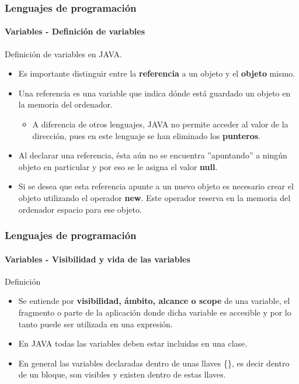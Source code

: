 \documentclass{beamer}
\begin{document}
\begin{frame}
  \frametitle{Lenguajes de programación} 
  \framesubtitle{Variables - Definición de variables}

  Definición de variables en JAVA.

  \begin{itemize}
  \item Es importante distinguir entre la \textbf{referencia} a un objeto y el \textbf{objeto} mismo.
  \item Una referencia es una variable que indica dónde está guardado un objeto en la memoria del ordenador.
    \begin{itemize}
    \item A diferencia de otros lenguajes, JAVA no permite acceder al valor de la dirección, pues en este lenguaje se han eliminado los \textbf{punteros}.
    \end{itemize}
  \item Al declarar una referencia, ésta aún no se encuentra ''apuntando'' a ningún objeto en particular y por eso se le asigna el valor \textbf{null}.
  \item Si se desea que esta referencia apunte a un nuevo objeto es necesario crear el objeto utilizando el operador \textbf{new}. Este operador reserva en la memoria del ordenador espacio para ese objeto. 
  \end{itemize}
\end{frame}

\begin{frame}
  \frametitle{Lenguajes de programación} 
  \framesubtitle{Variables - Visibilidad y vida de las variables}

  \begin{block}{Definición}
    \begin{itemize}
    \item Se entiende por \textbf{visibilidad, ámbito, alcance o scope} de una variable, el fragmento o parte de la aplicación donde dicha variable es accesible y por lo tanto puede ser utilizada en una expresión.
    \item En JAVA todas las variables deben estar incluidas en una clase.
    \item En general las variables declaradas dentro de unas llaves \{\}, es decir dentro de un bloque, son visibles y existen dentro de estas llaves. 
    \end{itemize}
  \end{block}
\end{frame}
\end{document}
